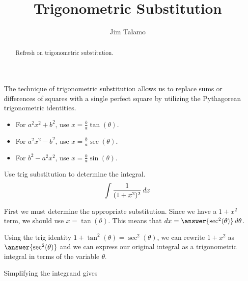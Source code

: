 \documentclass{ximera}
\title[Refresh:]{Trigonometric Substitution}
\author{Jim Talamo}
\begin{document}
\begin{abstract}
 Refresh on trigonometric substitution.
\end{abstract}
\maketitle


\begin{exercise}
The technique of trigonometric substitution allows us to replace sums or differences of squares with a single perfect square by utilizing the Pythagorean trigonometric identities.  

\begin{itemize}
\item For $a^2x^2+b^2$, use $x= \frac{b}{a} \tan(\theta)$.
\item For $a^2x^2-b^2$, use $x= \frac{b}{a} \sec(\theta)$.
\item For $b^2-a^2x^2$, use $x= \frac{b}{a} \sin(\theta)$.
\end{itemize}
 
\begin{example}
Use trig substitution to determine the integral.
\[
\int \frac{1}{(1+x^2)^2} \mathop{}\!d x
\]

\begin{explanation}
First we must determine the appropriate substitution.  Since we have a $1+x^2$ term, we should use $x=\tan(\theta)$.  This means that $\d x= \answer{ \sec^{2}(\theta)} \d \theta$. 

Using the trig identity $1+\tan^2(\theta)=\sec^{2}(\theta)$, we can rewrite $1+x^2$ as $\answer{\sec^{2}(\theta)}$ and we can express our original integral as a trigonometric integral in terms of the variable $\theta$. 

\begin{image}
  \end{image}

Simplifying the integrand gives


\end{explanation}
\end{example}
\end{exercise}
\end{document}
